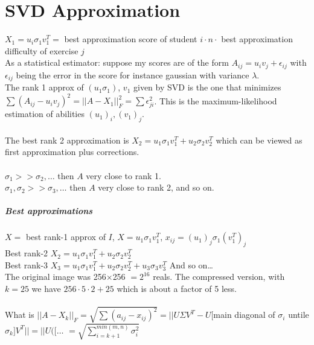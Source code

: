 \documentclass[10pt]{report}
\begin{document}
\section{SVD Approximation} $X_1 = u_i\sigma_1 v_1^T =$ best approximation score of student $i \cdot n \cdot$ best approximation difficulty of exercise $j$\\
As a statistical estimator: suppose my scores are of the form $A_{ij} = u_i v_j + \epsilon_{ij}$ with $\epsilon_{ij}$ being the error in the score for instance gaussian with variance $\lambda$.\\
The rank 1 approx of $(u_1\sigma_1)$, $v_1$ given by SVD is the one that minimizes $\sum (A_{ij} - u_iv_j)^2 = ||A-X_1||_F^2 = \sum \epsilon_{ji}^2$. This is the maximum-likelihood estimation of abilities $(u_1)_i, (v_1)_j$.\\\\
The best rank 2 approximation is $X_2 = u_1\sigma_1 v_1^T + u_2\sigma_2 v_2^T$ which can be viewed as first approximation plus corrections.\\\\
$\sigma_1 >> \sigma_2,\ldots$ then $A$ very close to rank 1.\\
$\sigma_1, \sigma_2 >> \sigma_3,\ldots$ then $A$ very close to rank 2, and so on.
\subparagraph{Best approximations} $X =$ best rank-1 approx of $I$, $X = u_1\sigma_1 v_1^T$, $x_{ij} = (u_1)_j \sigma_1 (v_1^T)_j$\\
Best rank-2 $X_2 = u_1\sigma_1 v_1^T + u_2 \sigma_2 v_2^T$\\
Best rank-3 $X_3 = u_1\sigma_1 v_1^T + u_2 \sigma_2 v_2^T + u_3 \sigma_3 v_3^T$
And so on\ldots\\
The original image was 256$\times$256 $= 2^{16}$ reals. The compressed version, with $k = 25$ we have $256\cdot5\cdot2 + 25$ which is about a factor of 5 less.\\\\
What is $||A - X_k||_F = \sqrt{\sum (a_{ij} - x_{ij})^2} = ||U\Sigma V^T - U[$main diagonal of $\sigma_i$ untile $\sigma_k] V^T|| = ||U([\ldots$ %
$= \sqrt{\sum_{i=k+1}^{min(m,n)} \sigma_i^2}$
\end{document}
